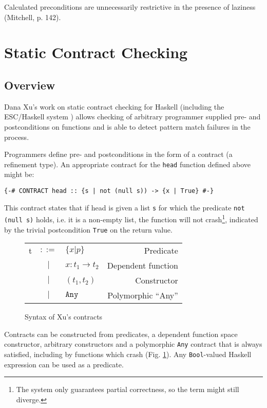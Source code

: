 \documentclass[a4paper]{report}
\begin{document}
Calculated preconditions are unnecessarily restrictive in the presence of laziness (Mitchell, p. 142).


\section{Static Contract Checking}
\subsection{Overview}
Dana Xu's work on static contract checking for Haskell \cite{Xu09staticcontract} (including the ESC/Haskell system \cite{Xu:2006:ESC:1159842.1159849}) allows checking of arbitrary programmer supplied pre- and postconditions on functions and is able to detect pattern match failures in the process.

Programmers define pre- and postconditions in the form of a contract (a refinement type). An appropriate contract for the \texttt{head} function defined above might be:
\begin{verbatim}
{-# CONTRACT head :: {s | not (null s)) -> {x | True} #-}
\end{verbatim}
This contract states that if head is given a list \texttt{s} for which the predicate \texttt{not (null s)} holds, i.e. it is a non-empty list, the function will not crash\footnote{The system only guarantees partial correctness, so the term might still diverge.}, indicated by the trivial postcondition \texttt{True} on the return value.

\begin{figure}
\centering
\begin{tabular}{lclr}
t &$::=$& $\{ x | p \}$     & Predicate          \\
  & $|$ & $x : t_1 \to t_2$ & Dependent function \\
  & $|$ & $(t_1, t_2)$      & Constructor         \\
  & $|$ & $\mathtt{Any}$    & Polymorphic ``Any''
\end{tabular}
\caption{Syntax of Xu's contracts}
\label{xu-contract-syntax}
\end{figure}

Contracts can be constructed from predicates, a dependent function space constructor, arbitrary constructors and a polymorphic \texttt{Any} contract that is always satisfied, including by functions which crash (Fig. \ref{xu-contract-syntax}). Any \texttt{Bool}-valued Haskell expression can be used as a predicate.
\end{document}
